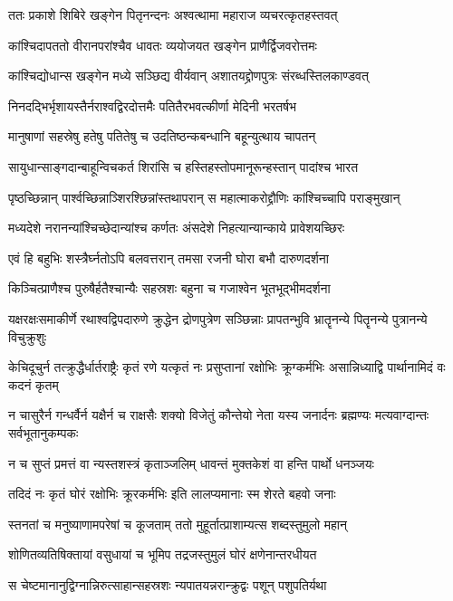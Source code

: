 \twolineshloka
{ततः प्रकाशे शिबिरे खङ्गेन पितृनन्दनः}
{अश्वत्थामा महाराज व्यचरत्कृतहस्तवत्}


\twolineshloka
{कांश्चिदापततो वीरानपरांश्चैव धावतः}
{व्ययोजयत खङ्गेन प्राणैर्द्विजवरोत्तमः}


\twolineshloka
{कांश्चिद्योधान्स खङ्गेन मध्ये सञ्छिद्य वीर्यवान्}
{अशातयद्द्रोणपुत्रः संरब्धस्तिलकाण्डवत्}


\twolineshloka
{निनदद्भिर्भृशायस्तैर्नराश्वद्विरदोत्तमैः}
{पतितैरभवत्कीर्णा मेदिनी भरतर्षभ}


\twolineshloka
{मानुषाणां सहस्रेषु हतेषु पतितेषु च}
{उदतिष्ठन्कबन्धानि बहून्युत्थाय चापतन्}


\twolineshloka
{सायुधान्साङ्गदान्बाहून्विचकर्त शिरांसि च}
{हस्तिहस्तोपमानूरून्हस्तान् पादांश्च भारत}


\twolineshloka
{पृष्ठच्छिन्नान् पार्श्वच्छिन्नाञ्शिरश्छिन्नांस्तथापरान्}
{स महात्माकरोद्द्रौणिः कांश्चिच्चापि पराङ्मुखान्}


\twolineshloka
{मध्यदेशे नरानन्यांश्चिच्छेदान्यांश्च कर्णतः}
{अंसदेशे निहत्यान्यान्काये प्रावेशयच्छिरः}


\twolineshloka
{एवं हि बहुभिः शस्त्रैर्घ्नतोऽपि बलवत्तरान्}
{तमसा रजनी घोरा बभौ दारुणदर्शना}


\twolineshloka
{किञ्चित्प्राणैश्च पुरुषैर्हतैश्चान्यैः सहस्रशः}
{बहुना च गजाश्वेन भूतभूद्भीमदर्शना}


\threelineshloka
{यक्षरक्षःसमाकीर्णे रथाश्वद्विपदारुणे}
{क्रुद्धेन द्रोणपुत्रेण सञ्छिन्नाः प्रापतन्भुवि}
{भ्रातॄनन्ये पितॄनन्ये पुत्रानन्ये विचुक्रुशुः}


\threelineshloka
{केचिदूचुर्न तत्क्रुद्धैर्धार्तराष्ट्रैः कृतं रणे}
{यत्कृतं नः प्रसुप्तानां रक्षोभिः क्रूग्कर्मभिः}
{असान्निध्याद्वि पार्थानामिदं वः कदनं कृतम्}


\threelineshloka
{न चासुरैर्न गन्धर्वैर्न यक्षैर्न च राक्षसैः}
{शक्यो विजेतुं कौन्तेयो नेता यस्य जनार्दनः}
{ब्रह्मण्यः मत्यवाग्दान्तः सर्वभूतानुकम्पकः}


\twolineshloka
{न च सुप्तं प्रमत्तं वा न्यस्तशस्त्रं कृताञ्जलिम्}
{धावन्तं मुक्तकेशं वा हन्ति पार्थो धनञ्जयः}


\twolineshloka
{तदिदं नः कृतं घोरं रक्षोभिः क्रूरकर्मभिः}
{इति लालप्यमानाः स्म शेरते बहवो जनाः}


\twolineshloka
{स्तनतां च मनुष्याणामपरेषां च कूजताम्}
{ततो मुहूर्तात्प्राशाम्यत्स शब्दस्तुमुलो महान्}


\twolineshloka
{शोणितव्यतिषिक्तायां वसुधायां च भूमिप}
{तद्रजस्तुमुलं घोरं क्षणेनान्तरधीयत}


\twolineshloka
{स चेष्टमानानुद्विग्नान्निरुत्साहान्सहस्रशः}
{न्यपातयन्नरान्क्रुद्वः पशून् पशुपतिर्यथा}


